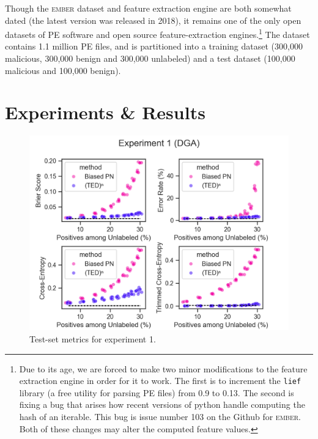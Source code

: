 \documentclass[conference]{IEEEtran}
\begin{document}
    Though the \textsc{ember} dataset and feature extraction engine are both somewhat dated (the latest version was released in 2018), it remains one of the only open datasets of PE software and open source feature-extraction engines.\footnote{Due to its age, we are forced to make two minor modifications to the feature extraction engine in order for it to work. The first is to increment the \texttt{lief} library (a free utility for parsing PE files) from 0.9 to 0.13. The second is fixing a bug that arises how recent versions of python handle computing the hash of an iterable. This bug is issue number 103 on the Github for \textsc{ember}. Both of these changes may alter the computed feature values.} The dataset contains 1.1 million PE files, and is partitioned into a training dataset (300,000 malicious, 300,000 benign and 300,000 unlabeled) and a test dataset (100,000 malicious and 100,000 benign).

\section{Experiments \& Results}
\label{sec:results}

    \begin{figure}
        \centering 
        \includegraphics[scale=0.5]{experiment-1}
        \caption{Test-set metrics for experiment 1.} 
        \label{fig:exp1} 
    \end{figure} 
\end{document}
